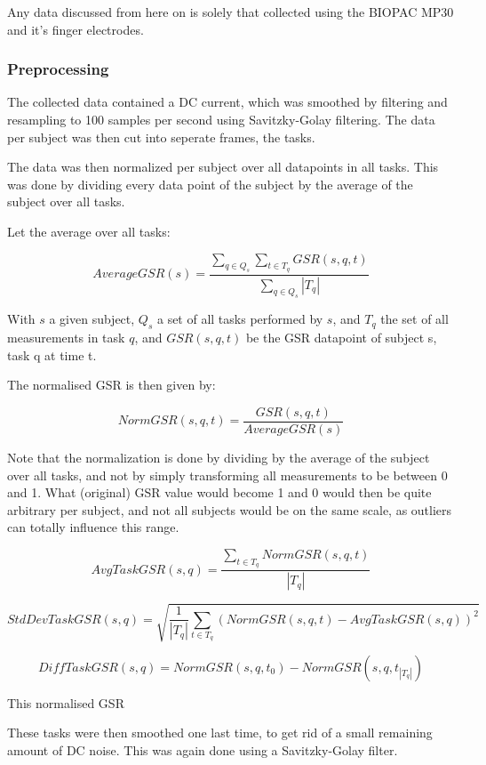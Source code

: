 \documentclass[12pt,fleqn,leqno,letterpaper]{article}
\begin{document}
Any data discussed from here on is solely that collected using the BIOPAC MP30 and it's finger electrodes.


\subsubsection{Preprocessing}
The collected data contained a DC current, which was smoothed by filtering and resampling to 100 samples per second using Savitzky-Golay filtering. 
The data per subject was then cut into seperate frames, the tasks. 

The data was then normalized per subject over all datapoints in all tasks. This was done by dividing every data point of the subject by the average of the subject over all tasks. 

Let the average over all tasks:


\[
AverageGSR(s) = \frac 
{\sum_{q \in Q_s}\sum_{t \in T_q} GSR(s,q,t)}
{ \sum_{q \in Q_s} \left\vert{T_q}\right\vert }
\]

With $s$ a given subject, $Q_s$ a set of all tasks performed by $s$, and $T_q$ the set of all measurements in task $q$, and $GSR(s,q,t)$ be the GSR datapoint of subject s, task q at time t.

The normalised GSR is then given by:

\[
NormGSR(s,q,t) = \frac{GSR(s,q,t)}{AverageGSR(s)}
\]

Note that the normalization is done by dividing by the average of the subject over all tasks, and not by simply transforming all measurements to be between 0 and 1. What (original) GSR value would become 1 and 0 would then be quite arbitrary per subject, and not all subjects would be on the same scale, as outliers can totally influence this range.






\[
AvgTaskGSR(s,q) = \frac { \sum_{t \in T_q} NormGSR(s,q,t) }
{\left\vert{T_q}\right\vert }
\]

\[
StdDevTaskGSR(s,q) = \sqrt {\frac{1}{\left\vert{T_q}\right\vert}   \sum_{t \in T_q} (NormGSR(s,q,t) - AvgTaskGSR(s,q))^2 }
\]

\[
DiffTaskGSR(s,q) = NormGSR(s,q, t_0) - NormGSR(s,q, t_{\left\vert{T_q}\right\vert})
\]

This normalised GSR 


These tasks were then smoothed one last time, to get rid of a small remaining amount of DC noise. This was again done using a Savitzky-Golay filter.
\end{document}
